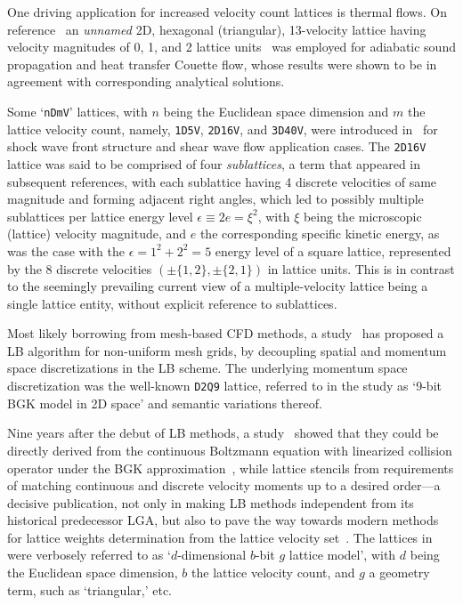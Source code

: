     One    driving    application     for     increased     velocity     count     lattices     is     thermal     flows.     On
    reference~\cite{1993-AlexanderFJ+SterlingJD-PhysRevE} an \emph{unnamed}  2D,  hexagonal  (triangular),  13-velocity  lattice
    having velocity magnitudes of 0,  1,  and  2  lattice  units~\cite{1998-ChenS+DoolenGD-AnnuRevFluidMech}  was  employed  for
    adiabatic sound propagation and heat transfer Couette flow, whose results were shown to be in agreement  with  corresponding
    analytical solutions.

    Some `\texttt{nDmV}' lattices, with $n$ being the Euclidean space dimension and $m$  the  lattice  velocity  count,  namely,
    \texttt{1D5V}, \texttt{2D16V}, and \texttt{3D40V}, were introduced  in~\cite{1994-ChenY+AkiyamaM-PhysRevE}  for  shock  wave
    front structure and shear wave flow application cases.  The  \texttt{2D16V}  lattice  was  said  to  be  comprised  of  four
    \emph{sublattices}, a term that appeared in subsequent references, with each sublattice having 4 discrete velocities of same
    magnitude and forming adjacent right angles, which led to possibly multiple sublattices per lattice energy  level  $\epsilon
    \equiv 2e = \xi^2$, with $\xi$ being the microscopic (lattice)  velocity  magnitude,  and  $e$  the  corresponding  specific
    kinetic energy, as was the case with the $\epsilon = 1^2 + 2^2 = 5$ energy level of a square lattice, represented by  the  8
    discrete velocities $(\pm\{1,2\},\pm\{2,1\})$ in lattice units. This is in contrast to the seemingly prevailing current view
    of a multiple-velocity lattice being a single lattice entity, without explicit reference to sublattices.

    Most likely borrowing from mesh-based CFD methods, a study~\cite{1996-HeX+DemboM-JComputPhys} has proposed  a  LB  algorithm
    for non-uniform mesh grids, by decoupling spatial and momentum space  discretizations  in  the  LB  scheme.  The  underlying
    momentum space discretization was the well-known \texttt{D2Q9} lattice, referred to in the study as `9-bit BGK model  in  2D
    space' and semantic variations thereof.

    Nine years after the debut of LB methods, a study~\cite{1997-HeX+LuoLS-PhysRevE} showed that they could be directly  derived
    from    the    continuous    Boltzmann    equation    with    linearized    collision     operator     under     the     BGK
    approximation~\cite{2011-HarrisS-Dover}, while lattice stencils  from  requirements  of  matching  continuous  and  discrete
    velocity moments up to a desired order---a decisive publication,  not  only  in  making  LB  methods  independent  from  its
    historical predecessor LGA, but also to pave the way towards modern methods  for  lattice  weights  determination  from  the
    lattice  velocity  set~\cite{2014-MattilaKK+PhilippiPC-SciWorldJ}.  The  lattices   in~\cite{1997-HeX+LuoLS-PhysRevE}   were
    verbosely referred to as `$d$-dimensional $b$-bit $g$ lattice model', with $d$ being the Euclidean space dimension, $b$  the
    lattice velocity count, and $g$ a geometry term, such as `triangular,' etc.

